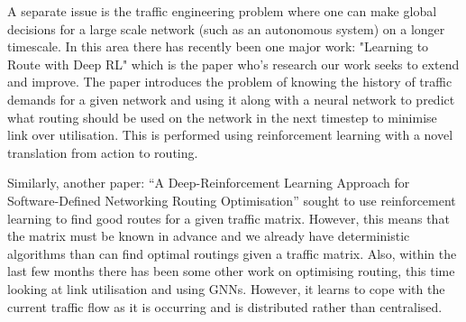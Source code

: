 A separate issue is the traffic engineering problem where one can make global decisions for a large scale network (such as an autonomous system) on a longer timescale. In this area there has recently been one major work: "Learning to Route with Deep RL"\cite{valadarsky2017learning} which is the paper who's research our work seeks to extend and improve. The paper introduces the problem of knowing the history of traffic demands for a given network and using it along with a neural network to predict what routing should be used on the network in the next timestep to minimise link over utilisation. This is performed using reinforcement learning with a novel translation from action to routing.

Similarly, another paper: ``A Deep-Reinforcement Learning Approach for Software-Defined Networking Routing Optimisation''\cite{stampa2017deep} sought to use reinforcement learning to find good routes for a given traffic matrix. However, this means that the matrix must be known in advance and we already have deterministic algorithms than can find optimal routings given a traffic matrix. Also, within the last few months there has been some other work on optimising routing, this time looking at link utilisation and using GNNs\cite{Sawada2020NetworkRO}. However, it learns to cope with the current traffic flow as it is occurring and is distributed rather than centralised.